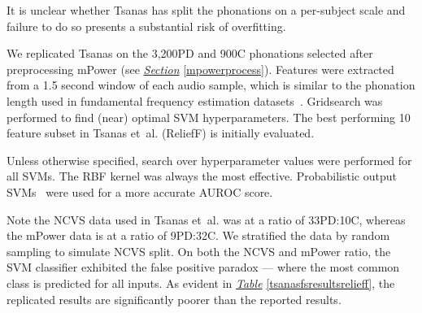 \documentclass[12pt, twoside]{book}
\begin{document}
 \begin{highlight}
 	It is unclear whether Tsanas has split the phonations on a per-subject scale and failure to do so presents a substantial risk of overfitting.
 \end{highlight}

We replicated Tsanas on the 3,200PD and 900C phonations selected after preprocessing mPower (see \textit{\hyperref[mpowerprocess]{Section}} \ref{mpowerprocess}). Features were extracted from a 1.5 second window of each audio sample, which is similar to the phonation length used in fundamental frequency estimation datasets~\cite{f0estimation}. Gridsearch was performed to find (near) optimal SVM hyperparameters. The best performing 10 feature subset in Tsanas et~al. (ReliefF) is initially evaluated.

\begin{highlight}[Hyperparameters]
	Unless otherwise specified, search over hyperparameter values were performed for all SVMs. The RBF kernel was always the most effective. Probabilistic output SVMs~\cite{svmprobabilistic} were used for a more accurate AUROC score.
\end{highlight}

Note the NCVS data used in Tsanas et~al. was at a ratio of 33PD:10C, whereas the mPower data is at a ratio of 9PD:32C. We stratified the data by random sampling to simulate NCVS split. On both the NCVS and mPower ratio, the SVM classifier exhibited the false positive paradox --- where the most common class is predicted for all inputs. As evident in \textit{\hyperref[tsanasfsresultsrelieff]{Table}} \ref{tsanasfsresultsrelieff}, the replicated results are significantly poorer than the reported results. 
\end{document}
